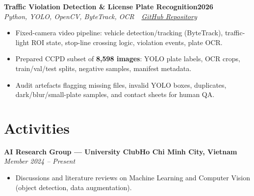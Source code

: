 \documentclass[10pt, a4paper]{article}
\newenvironment{cvitems}{%
    \begin{itemize}[leftmargin=1.4em, itemsep=0pt, topsep=1pt, parsep=0pt]
}{%
    \end{itemize}
}
\newcommand{\entryhead}[2]{%
    \noindent\textbf{#1}\hfill\textbf{#2}\\[-2pt]
}
\newcommand{\entrysub}[1]{%
    \noindent\textit{#1}\\[1pt]
}
\begin{document}
\vspace{3pt}

\entryhead{Traffic Violation Detection \& License Plate Recognition}{2026}
\entrysub{Python, YOLO, OpenCV, ByteTrack, OCR \,\textbullet\,
  \href{https://github.com/NguyenKhacBao564}{GitHub Repository}}
\begin{cvitems}
    \item Fixed-camera video pipeline: vehicle detection/tracking (ByteTrack), traffic-light ROI state, stop-line crossing logic, violation events, plate OCR.
    \item Prepared CCPD subset of \textbf{8,598 images}: YOLO plate labels, OCR crops, train/val/test splits, negative samples, manifest metadata.
    \item Audit artefacts flagging missing files, invalid YOLO boxes, duplicates, dark/blur/small-plate samples, and contact sheets for human QA.
\end{cvitems}

\section{Activities}

\entryhead{AI Research Group --- University Club}{Ho Chi Minh City, Vietnam}
\entrysub{Member \hfill 2024 -- Present}
\begin{cvitems}
    \item Discussions and literature reviews on Machine Learning and Computer Vision (object detection, data augmentation).
\end{cvitems}
\end{document}
